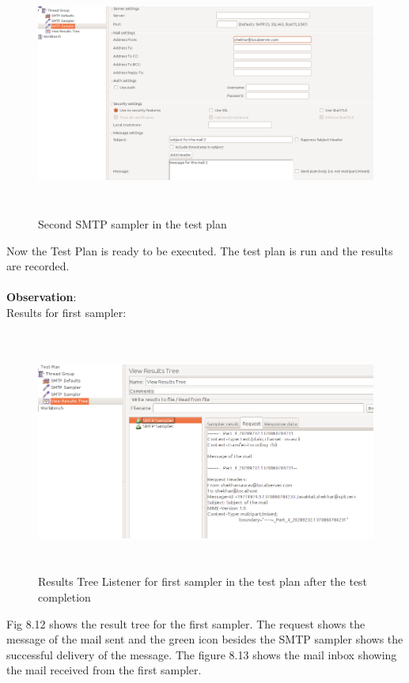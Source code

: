 \documentclass[12pt]{book}
\begin{document}
  \begin{figure}[H]
   \centering
   \includegraphics[width=15cm, height=8cm]{images/smtpdefaults_84}
   \caption{Second SMTP sampler in the test plan\label{fig:fig31_JMeter}}
  \end{figure} 
  
  Now the Test Plan is ready to be executed. The test plan is run and the results are recorded.\\
  \\
  \textbf{Observation}:
  \\
  Results for first sampler:\\
  \begin{figure}[H]
   \centering
   \includegraphics[width=15cm, height=8cm]{images/smtpdefaults_85}
   \caption{Results Tree Listener for first sampler in the test plan after the test completion\label{fig:fig32_JMeter}}
  \end{figure}
  
  Fig 8.12 shows the result tree for the first sampler. The request shows the message of the mail
  sent and the green icon besides the SMTP sampler shows the successful delivery of the message.
  The figure 8.13 shows the mail inbox showing the mail received from the first sampler.
  
\end{document}
